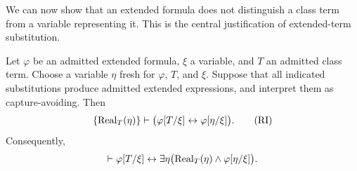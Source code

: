 
We can now show that an extended formula does not distinguish a
class term from a variable representing it. This is the central
justification of extended-term substitution.

\begin{metatheorem}
\label{meta:realization-invariance}
Let \(\varphi\) be an admitted extended formula, \(\xi\) a
variable, and \(T\) an admitted class term. Choose a variable
\(\eta\) fresh for \(\varphi\), \(T\), and \(\xi\).
Suppose that all indicated substitutions produce admitted
extended expressions, and interpret them as capture-avoiding.
Then
\[
\{\operatorname{Real}_T(\eta)\}
\vdash
\bigl(
\varphi[T/\xi]\leftrightarrow
\varphi[\eta/\xi]
\bigr).
\tag{RI}
\]
Consequently,
\[
\vdash
\varphi[T/\xi]
\leftrightarrow
\exists\eta\bigl(
\operatorname{Real}_T(\eta)\land\varphi[\eta/\xi]
\bigr).
\]
\end{metatheorem}

